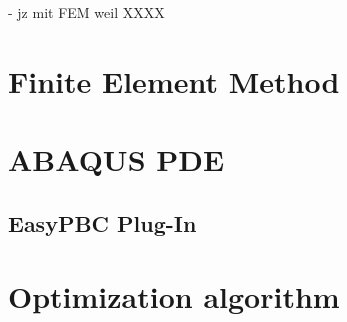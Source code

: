 



- jz mit FEM weil XXXX


\section{Finite Element Method}
\section{ABAQUS PDE}
\subsection{EasyPBC Plug-In}



\section{Optimization algorithm} \label{optimizationAlgorithm}

